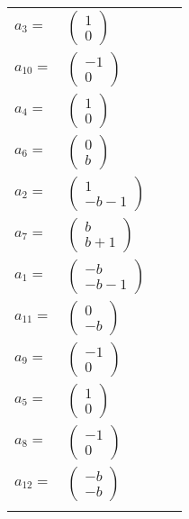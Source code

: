\documentclass[1p]{elsarticle_modified}
\theoremstyle{definition}
\begin{document}
\begin{tabular}{m{7pt} m{180pt} m{7pt} m{180pt} }
\flushright $a_{3}=$&$\begin{pmatrix}1\\0\end{pmatrix}$ \\
\flushright $a_{10}=$&$\begin{pmatrix}-1\\0\end{pmatrix}$ \\
\flushright $a_{4}=$&$\begin{pmatrix}1\\0\end{pmatrix}$ \\
\flushright $a_{6}=$&$\begin{pmatrix}0\\b\end{pmatrix}$ \\
\flushright $a_{2}=$&$\begin{pmatrix}1\\- b-1\end{pmatrix}$ \\
\flushright $a_{7}=$&$\begin{pmatrix}b\\b+1\end{pmatrix}$ \\
\flushright $a_{1}=$&$\begin{pmatrix}- b\\- b-1\end{pmatrix}$ \\
\flushright $a_{11}=$&$\begin{pmatrix}0\\- b\end{pmatrix}$ \\
\flushright $a_{9}=$&$\begin{pmatrix}-1\\0\end{pmatrix}$ \\
\flushright $a_{5}=$&$\begin{pmatrix}1\\0\end{pmatrix}$ \\
\flushright $a_{8}=$&$\begin{pmatrix}-1\\0\end{pmatrix}$ \\
\flushright $a_{12}=$&$\begin{pmatrix}- b\\- b\end{pmatrix}$\\&\end{tabular}
\end{document}
